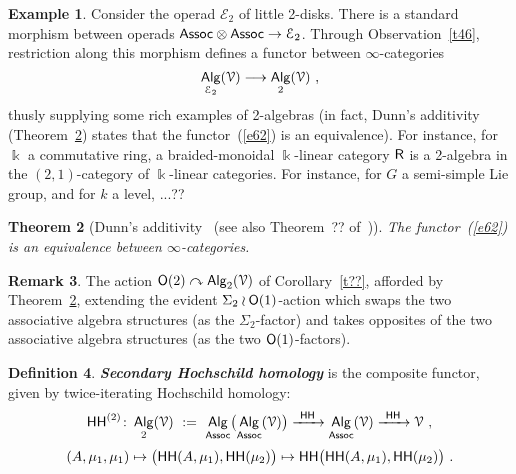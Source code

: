 \documentclass{amsart}
\newtheorem{theorem}{Theorem}[section]
\theoremstyle{definition}
\newtheorem{definition}[theorem]{Definition}
\newtheorem{remark}[theorem]{Remark}
\newtheorem{example}[theorem]{Example}
\theoremstyle{remark}
\DeclareMathOperator{\Alg}{\sf Alg}
\newcommand{\bit}[1]{\textbf{\textit{#1}}}
\newcommand{\lacts}{\curvearrowright}
\def\ot{\otimes}
\newcommand{\xra}{\xrightarrow}
\def\cE{\mathcal E}\def\cF{\mathcal F}\def\cG{\mathcal G}\def\cH{\mathcal H}
\DeclareMathOperator{\sHH}{\sf HH}
\DeclareMathOperator{\HHt}{{\sf HH}^{(2)}}
\begin{document}
\begin{example}
\label{r13}
Consider the operad $\cE_2$ of little 2-disks.  
There is a standard morphism between operads ${\sf Assoc}\ot{\sf Assoc} \to \cE_2$.
Through Observation~\ref{t46}, restriction along this morphism defines a functor between $\infty$-categories
\begin{equation}
\label{e62}
\Alg_{\cE_2}(\cV)
\longrightarrow
\Alg_2(\cV)
~,
\end{equation}
thusly supplying some rich examples of 2-algebras (in fact, Dunn's additivity (Theorem~\ref{t48}) states that the functor~(\ref{e62}) is an equivalence). 
For instance, for $\Bbbk$ a commutative ring, a braided-monoidal $\Bbbk$-linear category $\mathsf R$ is a 2-algebra in the $(2,1)$-category of $\Bbbk$-linear categories.  
{\color{magenta}
For instance, for $G$ a semi-simple Lie group, and for $k$ a level, ...??
}
 



\end{example}













\begin{theorem}[Dunn's additivity~\cite{dunn} (see also Theorem~?? of~\cite{HA})]
\label{t48}
The functor~(\ref{e62})
is an equivalence between $\infty$-categories.

\end{theorem}




\begin{remark}
The action $\sO(2)
\lacts
\Alg_2(\cV)$ of Corollary~\ref{t??}, afforded by Theorem~\ref{t48}, 
extending the evident $\Sigma_2 \wr \mathsf O(1)$-action which swaps the two associative algebra structures (as the $\Sigma_2$-factor) and takes opposites of the two associative algebra structures (as the two $\mathsf O(1)$-factors).
\end{remark}






\begin{definition}
\label{d5}
\bit{Secondary Hochschild homology} is the composite functor, given by twice-iterating Hochschild homology:
\[
\HHt
\colon
\Alg_2(\cV)
~:=~
\Alg_{\sf Assoc}\bigl(
\Alg_{\sf Assoc}(\cV)
\bigr)
\xra{~\sHH~}
\Alg_{\sf Assoc}(\cV)
\xra{~\sHH~}
\cV
~,
\]
\[
(A,\mu_1,\mu_1)
\mapsto
\bigl( \sHH(A,\mu_1) , \sHH(\mu_2) \bigr)
\mapsto
\sHH\bigl( 
\sHH(A,\mu_1)
,
\sHH(\mu_2)
\bigr)
~.
\]

\end{definition}
\end{document}
